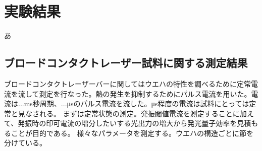 
\chapter{実験結果}
あ
\section{ブロードコンタクトレーザー試料に関する測定結果}%
ブロードコンタクトレーザーバーに関してはウエハの特性を調べるために定常電流を流して測定を行なった。熱の発生を抑制するためにパルス電流を用いた。電流は...ms秒周期、...μsのパルス電流を流した。μs程度の電流は試料にとっては定常と見なされる。
まずは定常状態の測定。発振閾値電流を測定することに加えて、発振時の印可電流の増分したいする光出力の増大から発光量子効率を見積もることが目的である。
様々なパラメータを測定する。ウエハの構造ごとに節を分けている。
